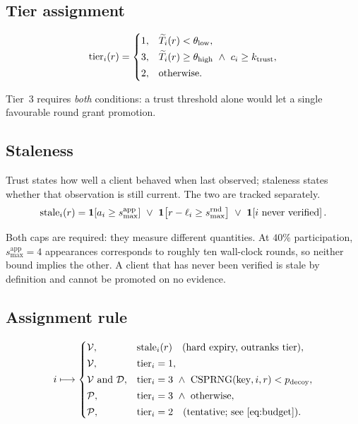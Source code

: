 \subsection{Tier assignment}

\begin{equation}
\mathrm{tier}_i(r)=
\begin{cases}
1, & \widetilde{T}_i(r) < \theta_{\mathrm{low}},\\[2pt]
3, & \widetilde{T}_i(r) \ge \theta_{\mathrm{high}} \ \wedge\  c_i \ge k_{\mathrm{trust}},\\[2pt]
2, & \text{otherwise.}
\end{cases}
\label{eq:tier}
\end{equation}

Tier~3 requires \emph{both} conditions: a trust threshold alone would let a
single favourable round grant promotion.

\subsection{Staleness}

Trust states how well a client behaved when last observed; staleness states
whether that observation is still current. The two are tracked separately.
\begin{equation}
\mathrm{stale}_i(r)=
\mathbf{1}\!\left[a_i \ge s^{\mathrm{app}}_{\max}\right]
\ \vee\
\mathbf{1}\!\left[r - \ell_i \ge s^{\mathrm{rnd}}_{\max}\right]
\ \vee\
\mathbf{1}\!\left[\text{$i$ never verified}\right].
\label{eq:stale}
\end{equation}

Both caps are required: they measure different quantities. At $40\%$
participation, $s^{\mathrm{app}}_{\max}=4$ appearances corresponds to roughly
ten wall-clock rounds, so neither bound implies the other. A client that has
never been verified is stale by definition and cannot be promoted on no
evidence.

\subsection{Assignment rule}

\begin{equation}
i \longmapsto
\begin{cases}
\Vset, & \mathrm{stale}_i(\round) \quad \text{(hard expiry, outranks tier)},\\[2pt]
\Vset, & \mathrm{tier}_i = 1,\\[2pt]
\Vset \ \text{and} \ \Dset, & \mathrm{tier}_i = 3 \ \wedge\ \mathrm{CSPRNG}(\mathrm{key},i,\round) < p_{\mathrm{decoy}},\\[2pt]
\Pset, & \mathrm{tier}_i = 3 \ \wedge\ \text{otherwise},\\[2pt]
\Pset, & \mathrm{tier}_i = 2 \quad \text{(tentative; see \eqref{eq:budget})}.
\end{cases}
\label{eq:assign}
\end{equation}

